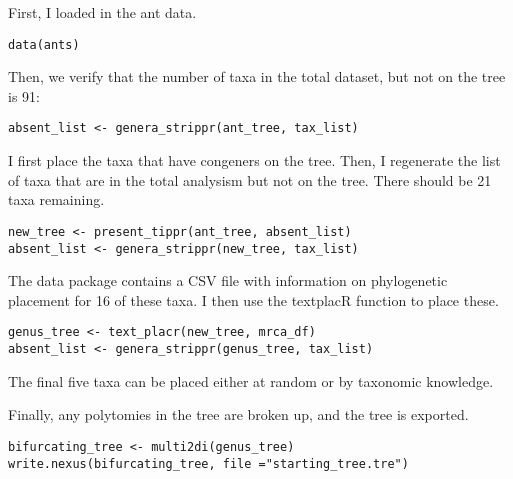 First, I loaded in the ant data.
{\tt \begin{snugshade*}
\begin{lstlisting}
data(ants)
\end{lstlisting}
\end{snugshade*}}

Then, we verify that the number of taxa in the total dataset, but not on the tree is 91:
{\tt \begin{snugshade*}
\begin{lstlisting}
absent_list <- genera_strippr(ant_tree, tax_list)
\end{lstlisting}
\end{snugshade*}}

I first place the taxa that have congeners on the tree. Then, I regenerate the list of taxa that are in the total analysism but not on the tree. There should be 21 taxa remaining.

{\tt \begin{snugshade*}
\begin{lstlisting}
new_tree <- present_tippr(ant_tree, absent_list)
absent_list <- genera_strippr(new_tree, tax_list)
\end{lstlisting}
\end{snugshade*}}

The data package contains a CSV file with information on phylogenetic placement for 16 of these taxa. I then use the textplacR function to place these.

{\tt \begin{snugshade*}
\begin{lstlisting}
genus_tree <- text_placr(new_tree, mrca_df)
absent_list <- genera_strippr(genus_tree, tax_list)
\end{lstlisting}
\end{snugshade*}}

The final five taxa can be placed either at random or by taxonomic knowledge. \par

Finally, any polytomies in the tree are broken up, and the tree is exported.

{\tt \begin{snugshade*}
\begin{lstlisting}
bifurcating_tree <- multi2di(genus_tree)
write.nexus(bifurcating_tree, file ="starting_tree.tre")
\end{lstlisting}
\end{snugshade*}}

